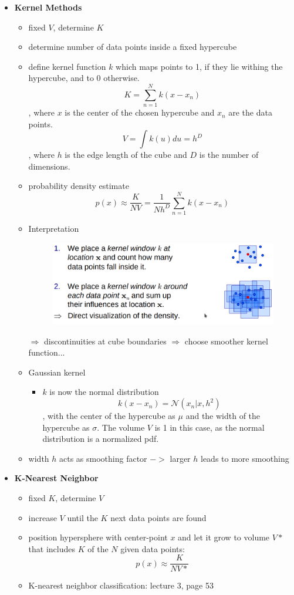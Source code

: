 \documentclass{article}
\begin{document}
\begin{itemize}
  \item \textbf{Kernel Methods}
  \begin{itemize}
    \item fixed $V$, determine $K$
    \item determine number of data points inside a fixed hypercube
    \item define kernel function  $k$ which maps points to 1, if they lie withing the hypercube, and to 0 otherwise.
    \[
      K = \sum_{n=1}^N k(x - x_n)
    \]
    , where $x$ is the center of the chosen hypercube and $x_n$ are the data points.
    \[
      V = \int k(u) du = h^D
    \]
    , where $h$ is the edge length of the cube and $D$ is the number of dimensions.
    \item probability density estimate
    \[
      p(x) \approx \frac{K}{NV} = \frac{1}{Nh^D} \sum_{n=1}^N k(x - x_n)
    \]
    \item Interpretation
    \begin{figure}[H]
      \centering
      \includegraphics[width=.5\textwidth]{kernel_methods_interpretation}
    \end{figure}

    $\Rightarrow$ discontinuities at cube boundaries $\Rightarrow$ choose smoother kernel function...
    \item Gaussian kernel
    \begin{itemize}
      \item $k$ is now the normal distribution
      \[
        k(x - x_n) = \mathcal{N}(x_n | x, h^2)
      \]
      , with the center of the hypercube as $\mu$ and the width of the hypercube as $\sigma$. The volume $V$ is 1 in this case, as the normal distribution is a normalized pdf.

    \end{itemize}
    \item width $h$ acts as smoothing factor $->$ larger $h$ leads to more smoothing
  \end{itemize}
  \item \textbf{K-Nearest Neighbor}
  \begin{itemize}
    \item fixed $K$, determine $V$
    \item increase $V$ until the $K$ next data points are found
    \item position hypersphere with center-point $x$ and let it grow to volume $V*$ that includes $K$ of the $N$ given data points:
    \[
      p(x) \approx \frac{K}{NV*}
    \]
    \item K-nearest neighbor classification: lecture 3, page 53
  \end{itemize}
\end{itemize}
\end{document}
